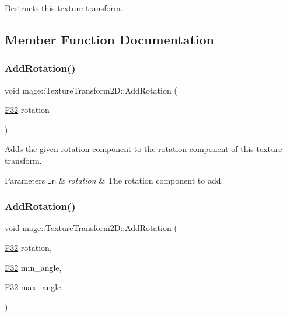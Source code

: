 Destructs this texture transform. 

\subsection{Member Function Documentation}
\mbox{\label{classmage_1_1_texture_transform2_d_a12cacfb40c70b6dd3872d2b27298845c}} 
\subsubsection{\texorpdfstring{Add\+Rotation()}{AddRotation()}\hspace{0.1cm}{\footnotesize\ttfamily [1/2]}}
{\footnotesize\ttfamily void mage\+::\+Texture\+Transform2\+D\+::\+Add\+Rotation (\begin{DoxyParamCaption}\item[{\mbox{\hyperlink{namespacemage_aa97e833b45f06d60a0a9c4fc22ae02c0}{F32}}}]{rotation }\end{DoxyParamCaption})\hspace{0.3cm}{\ttfamily [noexcept]}}

Adds the given rotation component to the rotation component of this texture transform.


\begin{DoxyParams}[1]{Parameters}
\mbox{\tt in}  & {\em rotation} & The rotation component to add. \\
\hline
\end{DoxyParams}
\mbox{\label{classmage_1_1_texture_transform2_d_a05c55877cd323ae22d9be03103cb6ec4}} 
\subsubsection{\texorpdfstring{Add\+Rotation()}{AddRotation()}\hspace{0.1cm}{\footnotesize\ttfamily [2/2]}}
{\footnotesize\ttfamily void mage\+::\+Texture\+Transform2\+D\+::\+Add\+Rotation (\begin{DoxyParamCaption}\item[{\mbox{\hyperlink{namespacemage_aa97e833b45f06d60a0a9c4fc22ae02c0}{F32}}}]{rotation,  }\item[{\mbox{\hyperlink{namespacemage_aa97e833b45f06d60a0a9c4fc22ae02c0}{F32}}}]{min\+\_\+angle,  }\item[{\mbox{\hyperlink{namespacemage_aa97e833b45f06d60a0a9c4fc22ae02c0}{F32}}}]{max\+\_\+angle }\end{DoxyParamCaption})\hspace{0.3cm}{\ttfamily [noexcept]}}

